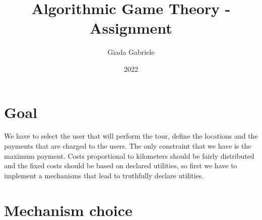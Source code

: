 \documentclass{article}
\title{Algorithmic Game Theory - Assignment}
\author{Giada Gabriele}
\date{2022}
\begin{document}
\maketitle
\section{Goal}
\large{
We have to select the user that will perform the tour, define the locations and the payments that are charged to the users. The only constraint that we have is the maximum payment. Costs proportional to kilometers should be fairly distributed and the fixed costs should be based on declared utilities, so first we have to implement a mechanisms that lead to truthfully declare utilities.
}
\section{Mechanism choice}
\end{document}
